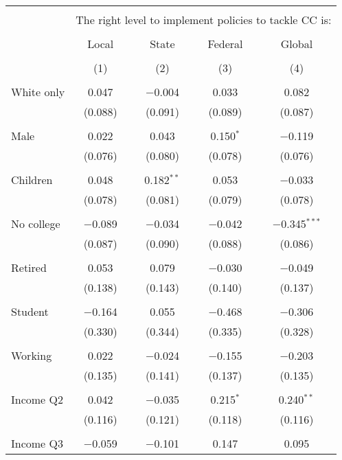 
\begin{tabular}{@{\extracolsep{5pt}}lcccc} 
\\[-1.8ex]\hline 
\hline \\[-1.8ex] 
 & \multicolumn{4}{c}{The right level to implement policies to tackle CC is:} \\ 
\cline{2-5} 
\\[-1.8ex] & Local & State & Federal & Global \\ 
\\[-1.8ex] & (1) & (2) & (3) & (4)\\ 
\hline \\[-1.8ex] 
 White only & 0.047 & $-$0.004 & 0.033 & 0.082 \\ 
  & (0.088) & (0.091) & (0.089) & (0.087) \\ 
  & & & & \\ 
 Male & 0.022 & 0.043 & 0.150$^{*}$ & $-$0.119 \\ 
  & (0.076) & (0.080) & (0.078) & (0.076) \\ 
  & & & & \\ 
 Children & 0.048 & 0.182$^{**}$ & 0.053 & $-$0.033 \\ 
  & (0.078) & (0.081) & (0.079) & (0.078) \\ 
  & & & & \\ 
 No college & $-$0.089 & $-$0.034 & $-$0.042 & $-$0.345$^{***}$ \\ 
  & (0.087) & (0.090) & (0.088) & (0.086) \\ 
  & & & & \\ 
 Retired & 0.053 & 0.079 & $-$0.030 & $-$0.049 \\ 
  & (0.138) & (0.143) & (0.140) & (0.137) \\ 
  & & & & \\ 
 Student & $-$0.164 & 0.055 & $-$0.468 & $-$0.306 \\ 
  & (0.330) & (0.344) & (0.335) & (0.328) \\ 
  & & & & \\ 
 Working & 0.022 & $-$0.024 & $-$0.155 & $-$0.203 \\ 
  & (0.135) & (0.141) & (0.137) & (0.135) \\ 
  & & & & \\ 
 Income Q2 & 0.042 & $-$0.035 & 0.215$^{*}$ & 0.240$^{**}$ \\ 
  & (0.116) & (0.121) & (0.118) & (0.116) \\ 
  & & & & \\ 
 Income Q3 & $-$0.059 & $-$0.101 & 0.147 & 0.095 \\ 

\end{tabular}
